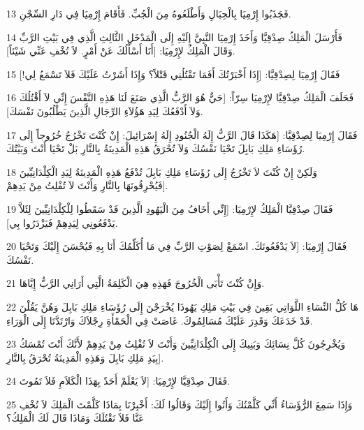 \par 13 فَجَذَبُوا إِرْمِيَا بِالْحِبَالِ وَأَطْلَعُوهُ مِنَ الْجُبِّ. فَأَقَامَ إِرْمِيَا فِي دَارِ السِّجْنِ.
\par 14 فَأَرْسَلَ الْمَلِكُ صِدْقِيَّا وَأَخَذَ إِرْمِيَا النَّبِيَّ إِلَيْهِ إِلَى الْمَدْخَلِ الثَّالِثِ الَّذِي فِي بَيْتِ الرَّبِّ وَقَالَ الْمَلِكُ لإِرْمِيَا: [أَنَا أَسْأَلُكَ عَنْ أَمْرٍ. لاَ تُخْفِ عَنِّي شَيْئاً].
\par 15 فَقَالَ إِرْمِيَا لِصِدْقِيَّا: [إِذَا أَخْبَرْتُكَ أَفَمَا تَقْتُلُنِي قَتْلاً؟ وَإِذَا أَشَرْتُ عَلَيْكَ فَلاَ تَسْمَعُ لِي!]
\par 16 فَحَلَفَ الْمَلِكُ صِدْقِيَّا لإِرْمِيَا سِرّاً: [حَيٌّ هُوَ الرَّبُّ الَّذِي صَنَعَ لَنَا هَذِهِ النَّفْسَ إِنِّي لاَ أَقْتُلُكَ وَلاَ أَدْفَعُكَ لِيَدِ هَؤُلاَءِ الرِّجَالِ الَّذِينَ يَطْلُبُونَ نَفْسَكَ].
\par 17 فَقَالَ إِرْمِيَا لِصِدْقِيَّا: [هَكَذَا قَالَ الرَّبُّ إِلَهُ الْجُنُودِ إِلَهُ إِسْرَائِيلَ: إِنْ كُنْتَ تَخْرُجُ خُرُوجاً إِلَى رُؤَسَاءِ مَلِكِ بَابِلَ تَحْيَا نَفْسُكَ وَلاَ تُحْرَقُ هَذِهِ الْمَدِينَةُ بِالنَّارِ بَلْ تَحْيَا أَنْتَ وَبَيْتُكَ.
\par 18 وَلَكِنْ إِنْ كُنْتَ لاَ تَخْرُجُ إِلَى رُؤَسَاءِ مَلِكِ بَابِلَ تُدْفَعُ هَذِهِ الْمَدِينَةُ لِيَدِ الْكِلْدَانِيِّينَ فَيُحْرِقُونَهَا بِالنَّارِ وَأَنْتَ لاَ تُفْلِتُ مِنْ يَدِهِمْ].
\par 19 فَقَالَ صِدْقِيَّا الْمَلِكُ لإِرْمِيَا: [إِنِّي أَخَافُ مِنَ الْيَهُودِ الَّذِينَ قَدْ سَقَطُوا لِلْكِلْدَانِيِّينَ لِئَلاَّ يَدْفَعُونِي لِيَدِهِمْ فَيَزْدَرُوا بِي].
\par 20 فَقَالَ إِرْمِيَا: [لاَ يَدْفَعُونَكَ. اسْمَعْ لِصَوْتِ الرَّبِّ فِي مَا أُكَلِّمُكَ أَنَا بِهِ فَيُحْسَنَ إِلَيْكَ وَتَحْيَا نَفْسُكَ.
\par 21 وَإِنْ كُنْتَ تَأْبَى الْخُرُوجَ فَهَذِهِ هِيَ الْكَلِمَةُ الَّتِي أَرَانِي الرَّبُّ إِيَّاهَا.
\par 22 هَا كُلُّ النِّسَاءِ اللَّوَاتِي بَقِينَ فِي بَيْتِ مَلِكِ يَهُوذَا يُخْرَجْنَ إِلَى رُؤَسَاءِ مَلِكِ بَابِلَ وَهُنَّ يَقُلْنَ قَدْ خَدَعَكَ وَقَدِرَ عَلَيْكَ مُسَالِمُوكَ. غَاصَتْ فِي الْحَمْأَةِ رِجْلاَكَ وَارْتَدَّتَا إِلَى الْوَرَاءِ.
\par 23 وَيُخْرِجُونَ كُلَّ نِسَائِكَ وَبَنِيكَ إِلَى الْكِلْدَانِيِّينَ وَأَنْتَ لاَ تُفْلِتُ مِنْ يَدِهِمْ لأَنَّكَ أَنْتَ تُمْسَكُ بِيَدِ مَلِكِ بَابِلَ وَهَذِهِ الْمَدِينَةُ تُحْرَقُ بِالنَّارِ].
\par 24 فَقَالَ صِدْقِيَّا لإِرْمِيَا: [لاَ يَعْلَمْ أَحَدٌ بِهَذَا الْكَلاَمِ فَلاَ تَمُوتَ.
\par 25 وَإِذَا سَمِعَ الرُّؤَسَاءُ أَنِّي كَلَّمْتُكَ وَأَتُوا إِلَيْكَ وَقَالُوا لَكَ: أَخْبِرْنَا بِمَاذَا كَلَّمْتَ الْمَلِكَ لاَ تُخْفِ عَنَّا فَلاَ نَقْتُلَكَ وَمَاذَا قَالَ لَكَ الْمَلِكُ؟
